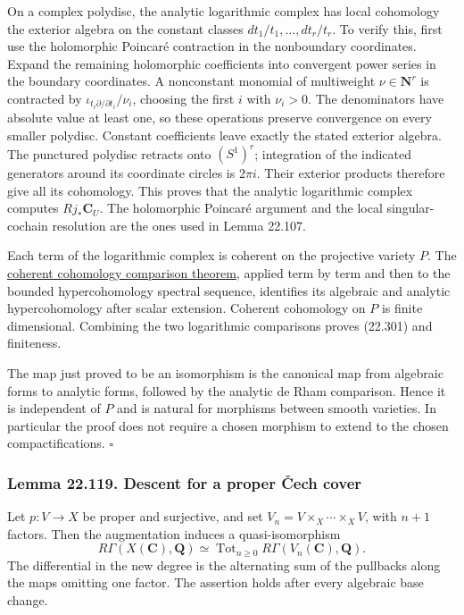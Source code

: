 \documentclass[
  11pt,
  a4paper,
]{article}
\begin{document}
On a complex polydisc, the analytic logarithmic complex has local
cohomology the exterior algebra on the constant classes
\(dt_1/t_1,\ldots,dt_r/t_r\). To verify this, first use the holomorphic
Poincaré contraction in the nonboundary coordinates. Expand the
remaining holomorphic coefficients into convergent power series in the
boundary coordinates. A nonconstant monomial of multiweight
\(\nu\in\mathbf N^r\) is contracted by
\(\iota_{t_i\partial/\partial t_i}/\nu_i\), choosing the first \(i\)
with \(\nu_i>0\). The denominators have absolute value at least one, so
these operations preserve convergence on every smaller polydisc.
Constant coefficients leave exactly the stated exterior algebra. The
punctured polydisc retracts onto \((S^1)^r\); integration of the
indicated generators around its coordinate circles is \(2\pi i\). Their
exterior products therefore give all its cohomology. This proves that
the analytic logarithmic complex computes \(Rj_*\mathbf C_U\). The
holomorphic Poincaré argument and the local singular-cochain resolution
are the ones used in Lemma 22.107.

Each term of the logarithmic complex is coherent on the projective
variety \(P\). The
\href{https://kokunoyumeto.github.io/open-math-courses-public/courses/AG-QC/serres-comparison-theorems-and-chows-theorem.html\#3-the-first-comparison-theorem}{coherent
cohomology comparison theorem}, applied term by term and then to the
bounded hypercohomology spectral sequence, identifies its algebraic and
analytic hypercohomology after scalar extension. Coherent cohomology on
\(P\) is finite dimensional. Combining the two logarithmic comparisons
proves (22.301) and finiteness.

The map just proved to be an isomorphism is the canonical map from
algebraic forms to analytic forms, followed by the analytic de Rham
comparison. Hence it is independent of \(P\) and is natural for
morphisms between smooth varieties. In particular the proof does not
require a chosen morphism to extend to the chosen compactifications.
\(\square\)

\subsubsection{Lemma 22.119. Descent for a proper Čech
cover}\label{lemma-22.119.-descent-for-a-proper-ux10dech-cover}

Let \(p:V\to X\) be proper and surjective, and set
\(V_n=V\times_X\cdots\times_XV\), with \(n+1\) factors. Then the
augmentation induces a quasi-isomorphism \[
 R\Gamma(X(\mathbf C),\mathbf Q)
       \simeq
 \operatorname{Tot}_{n\ge0}R\Gamma(V_n(\mathbf C),\mathbf Q).
 \tag{22.305}
\] The differential in the new degree is the alternating sum of the
pullbacks along the maps omitting one factor. The assertion holds after
every algebraic base change.
\end{document}
